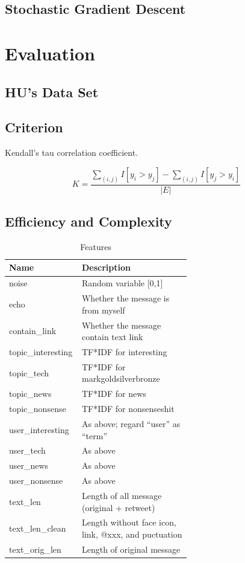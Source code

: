 \documentclass{sig-alternate}
\begin{document}
\subsection{Stochastic Gradient Descent}
\label{sec:Stochastic Gradient Descent}


\section{Evaluation}
\label{sec:Evaluation}

\subsection{HU's Data Set}
\label{sec:HU's Data Set}

\subsection{Criterion}
\label{sec:Criterion}

Kendall's tau correlation coefficient. 

\begin{equation}
	K = \frac{\sum_{(i,j)}{I[y_i>y_j]} - \sum_{(i,j)}{I[y_j>y_i]}}{|E|}
\end{equation}

\subsection{Efficiency and Complexity}
\label{sec:Efficiency and Complexity}

\begin{table}[t!]
	\caption{Features}
	\centering
	\begin{tabular}{|l|p{0.6\linewidth}|}
		\hline
		Name & Description \\
		\hline
		noise & Random variable [0,1]\\
		echo & Whether the message is from myself\\
		contain\_link & Whether the message contain text link\\
		topic\_interesting & TF*IDF for {interesting}\\
		topic\_tech & TF*IDF for {mark}{gold}{silver}{bronze}\\
		topic\_news & TF*IDF for {news}\\
		topic\_nonsense & TF*IDF for {nonsense}{shit}\\
		user\_interesting & As above; regard ``user'' as ``term''\\
		user\_tech & As above\\
		user\_news & As above\\
		user\_nonsense & As above\\
		text\_len & Length of all message (original + retweet)\\
		text\_len\_clean & Length without face icon, link, @xxx, and puctuation\\
		text\_orig\_len & Length of original message\\
		\hline
	\end{tabular}
\end{table}
\end{document}
